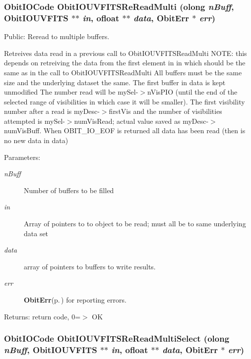 \subsubsection{\setlength{\rightskip}{0pt plus 5cm}Obit\-IOCode Obit\-IOUVFITSRe\-Read\-Multi ({\bf olong} {\em n\-Buff}, {\bf Obit\-IOUVFITS} $\ast$$\ast$ {\em in}, {\bf ofloat} $\ast$$\ast$ {\em data}, {\bf Obit\-Err} $\ast$ {\em err})}\label{ObitIOUVFITS_8h_a16}


Public: Reread to multiple buffers. 

Retreives data read in a previous call to Obit\-IOUVFITSRead\-Multi NOTE: this depends on retreiving the data from the first element in in which should be the same as in the call to Obit\-IOUVFITSRead\-Multi All buffers must be the same size and the underlying dataset the same. The first buffer in data is kept unmodified The number read will be my\-Sel-$>$n\-Vis\-PIO (until the end of the selected range of visibilities in which case it will be smaller). The first visibility number after a read is my\-Desc-$>$first\-Vis and the number of visibilities attempted is my\-Sel-$>$num\-Vis\-Read; actual value saved as my\-Desc-$>$num\-Vis\-Buff. When OBIT\_\-IO\_\-EOF is returned all data has been read (then is no new data in data) \begin{Desc}
\item[Parameters:]
\begin{description}
\item[{\em n\-Buff}]Number of buffers to be filled \item[{\em in}]Array of pointers to to object to be read; must all be to same underlying data set \item[{\em data}]array of pointers to buffers to write results. \item[{\em err}]{\bf Obit\-Err}{\rm (p.\,\pageref{structObitErr})} for reporting errors. \end{description}
\end{Desc}
\begin{Desc}
\item[Returns:]return code, 0=$>$ OK \end{Desc}
\subsubsection{\setlength{\rightskip}{0pt plus 5cm}Obit\-IOCode Obit\-IOUVFITSRe\-Read\-Multi\-Select ({\bf olong} {\em n\-Buff}, {\bf Obit\-IOUVFITS} $\ast$$\ast$ {\em in}, {\bf ofloat} $\ast$$\ast$ {\em data}, {\bf Obit\-Err} $\ast$ {\em err})}\label{ObitIOUVFITS_8h_a18}


